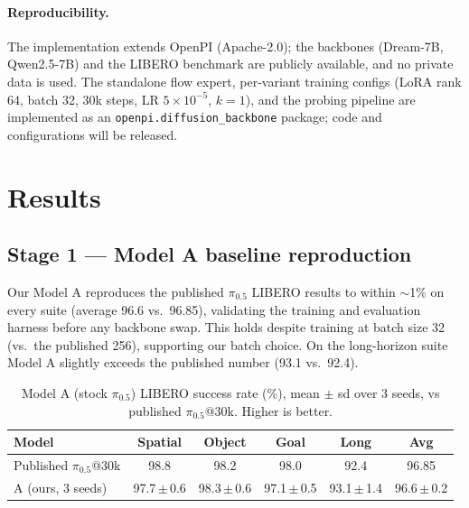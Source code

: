 \documentclass[conference]{IEEEtran}
\begin{document}
\paragraph{Reproducibility.} The implementation extends OpenPI \cite{openpi}
(Apache-2.0); the backbones (Dream-7B, Qwen2.5-7B) and the LIBERO benchmark are
publicly available, and no private data is used. The standalone flow expert,
per-variant training configs (LoRA rank 64, batch 32, 30k steps, LR $5\times
10^{-5}$, $k{=}1$), and the probing pipeline are implemented as an
\texttt{openpi.diffusion\_backbone} package; code and configurations will be
released.

\section{Results}

\subsection{Stage 1 --- Model A baseline reproduction}
Our Model A reproduces the published $\pi_{0.5}$ LIBERO results to within
$\sim$1\% on every suite (average 96.6 vs.\ 96.85), validating the training and
evaluation harness before any backbone swap. This holds despite training at
batch size 32 (vs.\ the published 256), supporting our batch choice. On the
long-horizon suite Model A slightly exceeds the published number (93.1 vs.\ 92.4).

\begin{table}[t]
\centering
\caption{Model A (stock $\pi_{0.5}$) LIBERO success rate (\%), mean $\pm$ sd over
3 seeds, vs published $\pi_{0.5}$@30k. Higher is better.}
\begin{tabular}{lccccc}
\toprule
Model & Spatial & Object & Goal & Long & Avg \\
\midrule
Published $\pi_{0.5}$@30k & 98.8 & 98.2 & 98.0 & 92.4 & 96.85 \\
A (ours, 3 seeds) & 97.7\,$\pm$\,0.6 & 98.3\,$\pm$\,0.6 & 97.1\,$\pm$\,0.5 & 93.1\,$\pm$\,1.4 & 96.6\,$\pm$\,0.2 \\
\bottomrule
\end{tabular}
\end{table}
\end{document}
